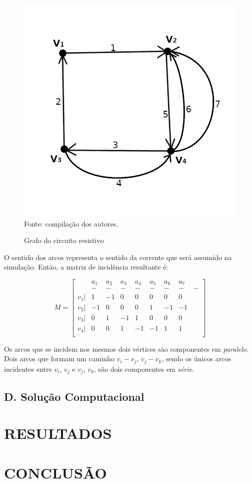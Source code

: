 \documentclass[twocolumn, 10pt]{extarticle}
\begin{document}
\begin{figure}[H]
	\caption{Grafo do circuito resistivo} 
	\centering
	\includegraphics[scale=1]{grcrc1}
	\\ Fonte: compilação dos autores.
\end{figure}

O sentido dos arcos representa o sentido da corrente que será assumido na simulação. Então, a matriz de incidência resultante é:

\[
M = 
\begin{bmatrix}
 & a_1 & a_2 & a_3 & a_4 & a_5 & a_6 & a_7 \\
 & - & - & - & - & - & - & - & - \\
 v_1 |& 1  & -1 & 0  & 0  & 0  & 0  & 0  \\
 v_2 |& -1 & 0  & 0  & 0  & 1  & -1 & -1 \\
 v_3 |& 0  & 1  & -1 & 1  & 0  & 0  & 0  \\
 v_4 |& 0  & 0  & 1  & -1 & -1 & 1  & 1  \\
\end{bmatrix}
\]

Os arcos que se incidem nos mesmos dois vértices são componentes em \textit{paralelo}. Dois arcos que formam um caminho $v_i - v_j$, $v_j - v_k$, sendo os únicos arcos incidentes entre $v_i$, $v_j$ e $v_j$, $v_k$, são dois componentes em \textit{série}.

\subsection*{D. \quad Solução Computacional}

\section{RESULTADOS}

\section{CONCLUSÃO}


\renewcommand{\refname}{REFERÊNCIAS}

\end{document}
